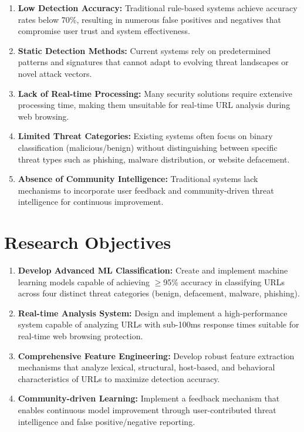 \begin{enumerate}
	\item \textbf{Low Detection Accuracy:} Traditional rule-based systems achieve accuracy rates below 70\%, resulting in numerous false positives and negatives that compromise user trust and system effectiveness.
	
	\item \textbf{Static Detection Methods:} Current systems rely on predetermined patterns and signatures that cannot adapt to evolving threat landscapes or novel attack vectors.
	
	\item \textbf{Lack of Real-time Processing:} Many security solutions require extensive processing time, making them unsuitable for real-time URL analysis during web browsing.
	
	\item \textbf{Limited Threat Categories:} Existing systems often focus on binary classification (malicious/benign) without distinguishing between specific threat types such as phishing, malware distribution, or website defacement.
	
	\item \textbf{Absence of Community Intelligence:} Traditional systems lack mechanisms to incorporate user feedback and community-driven threat intelligence for continuous improvement.
\end{enumerate}

\section{Research Objectives}

\begin{enumerate}
	\item \textbf{Develop Advanced ML Classification:} Create and implement machine learning models capable of achieving $\geq$95\% accuracy in classifying URLs across four distinct threat categories (benign, defacement, malware, phishing).
	
	\item \textbf{Real-time Analysis System:} Design and implement a high-performance system capable of analyzing URLs with sub-100ms response times suitable for real-time web browsing protection.
	
	\item \textbf{Comprehensive Feature Engineering:} Develop robust feature extraction mechanisms that analyze lexical, structural, host-based, and behavioral characteristics of URLs to maximize detection accuracy.
	
	\item \textbf{Community-driven Learning:} Implement a feedback mechanism that enables continuous model improvement through user-contributed threat intelligence and false positive/negative reporting.
\end{enumerate}

